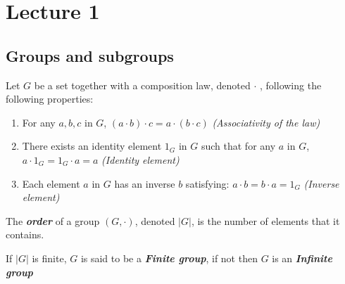 
\section{Lecture 1}

\subsection{Groups and subgroups}
\begin{boxedDefinition}[Group]\label{def:group-def}
    
Let $G$ be a set together with a composition law, denoted $\cdot$ , following the following properties:
\begin{enumerate}
\item\label{def:group-def-associativity} For any $a, b, c$ in $G$, $(a \cdot b) \cdot c = a \cdot (b \cdot c)$ \textit{(Associativity of the law)}
\item\label{def:group-def-neutral-element} There exists an identity element $1_G$ in $G$ such that for any $a$ in $G$, $a\cdot 1_G = 1_G\cdot a = a$ \textit{(Identity element)}
\item \label{def:group-def-inverse} Each element $a$ in $G$ has an inverse $b$ satisfying: $a \cdot b = b \cdot a = 1_G$ \textit{(Inverse element)}
\end{enumerate} 
\end{boxedDefinition}

\begin{boxedDefinition}[Order]\label{def:group-order}
    The \textit{\textbf{order}} of a group $(G, \cdot)$, denoted $|G|$, is the number of elements that it contains.
\end{boxedDefinition}
 If $|G|$ is finite, $G$ is said to be a \textit{\textbf{Finite group}}, if not then $G$ is an \textit{\textbf{Infinite group}}


